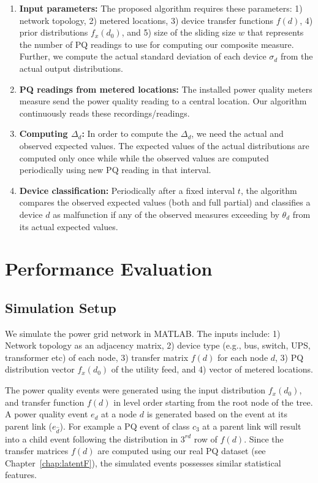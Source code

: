 \begin{enumerate}
\item \textbf{Input parameters:} The proposed algorithm requires these parameters: 1) network topology, 2) metered locations, 3) device transfer functions $f(d)$, 4) prior distributions $f_x(d_0)$, and 5) size of the sliding size $w$ that represents the number of PQ readings to use for computing our composite measure. Further, we compute the actual standard deviation of each device $\sigma_d$ from the actual output distributions.
\item \textbf{PQ readings from metered locations:} The installed power quality meters measure send the power quality reading to a central location. Our algorithm continuously reads these recordings/readings.
\item \textbf{Computing $\Delta_d$:} In order to compute the $\Delta_d$, we need the actual and observed expected values. The expected values of the actual distributions are computed only once while while the observed values are computed periodically using new PQ reading in that interval.
\item \textbf{Device classification:} Periodically after a fixed interval $t$, the algorithm compares the observed expected values (both and full partial) and classifies a device $d$ as malfunction if any of the observed measures exceeding by $\theta_d$ from its actual expected values.
\end{enumerate}


\section{Performance Evaluation}
\subsection{Simulation Setup}
We simulate the power grid network in MATLAB. The inputs include: 1) Network topology as an adjacency matrix, 2) device type (e.g., bus, switch, UPS, transformer etc) of each node, 3) transfer matrix $f(d)$ for each node $d$, 3) PQ distribution vector $f_x(d_0)$ of the utility feed, and 4) vector of metered locations.

The power quality events were generated using the input distribution $f_x(d_0)$, and transfer function $f(d)$ in level order starting from the root node of the tree. A power quality event $e_d$ at a node $d$ is generated based on the event at its parent link ($e_{\widehat d}$). For example a PQ event of class $c_3$ at a parent link will result into a child event following the distribution in $3^{rd}$ row of $f(d)$. Since the transfer matrices $f(d)$ are computed using our real PQ dataset (see Chapter~\ref{chap:latentF}), the simulated events possesses similar statistical features.

